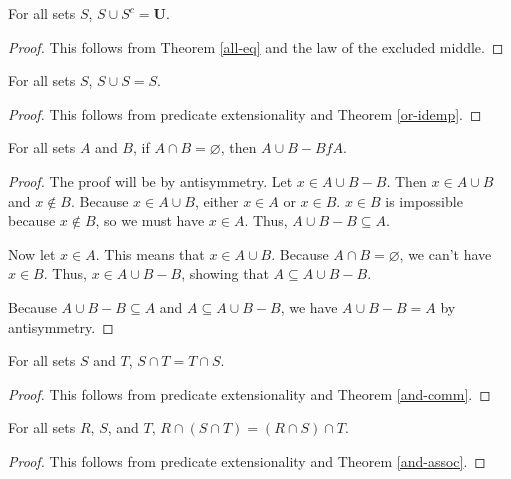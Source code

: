 \documentclass[../math.tex]{subfiles}
\begin{document}
\begin{theorem} \label{union-compl-all}
    For all sets $S$, $S \cup S^c = \bm U$.
\end{theorem}
\begin{proof}
    This follows from Theorem \ref{all-eq} and the law of the excluded middle.
\end{proof}

\begin{theorem} \label{union-idemp}
    For all sets $S$, $S \cup S = S$.
\end{theorem}
\begin{proof}
    This follows from predicate extensionality and Theorem \ref{or-idemp}.
\end{proof}

\begin{theorem} \label{union-minus}
    For all sets $A$ and $B$, if $A \cap B = \varnothing$, then $A \cup B - B f
    A$.
\end{theorem}
\begin{proof}
    The proof will be by antisymmetry.  Let $x \in A \cup B - B$.  Then $x \in A
    \cup B$ and $x \notin B$.  Because $x \in A \cup B$, either $x \in A$ or $x
    \in B$.  $x \in B$ is impossible because $x \notin B$, so we must have $x \in
    A$.  Thus, $A \cup B - B \subseteq A$.

    Now let $x \in A$.  This means that $x \in A \cup B$.  Because $A \cap B =
    \varnothing$, we can't have $x \in B$.  Thus, $x \in A \cup B - B$, showing
    that $A \subseteq A \cup B - B$.

    Because $A \cup B - B \subseteq A$ and $A \subseteq A \cup B - B$, we have
    $A \cup B - B = A$ by antisymmetry.
\end{proof}

\begin{theorem} \label{inter-comm}
    For all sets $S$ and $T$, $S \cap T = T \cap S$.
\end{theorem}
\begin{proof}
    This follows from predicate extensionality and Theorem \ref{and-comm}.
\end{proof}

\begin{theorem} \label{inter-assoc}
    For all sets $R$, $S$, and $T$, $R \cap (S \cap T) = (R \cap S) \cap T$.
\end{theorem}
\begin{proof}
    This follows from predicate extensionality and Theorem \ref{and-assoc}.
\end{proof}
\end{document}
